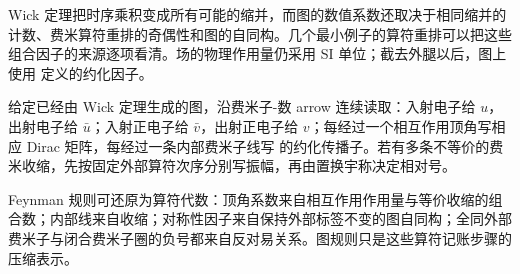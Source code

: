 
Wick 定理把时序乘积变成所有可能的缩并，而图的数值系数还取决于相同缩并的计数、费米算符重排的奇偶性和图的自同构。几个最小例子的算符重排可以把这些组合因子的来源逐项看清。场的物理作用量仍采用 SI 单位；截去外腿以后，图上使用
定义的约化因子。

给定已经由 Wick 定理生成的图，沿费米子-数 arrow 连续读取：入射电子给 $u$，出射电子给 $\bar u$；入射正电子给 $\bar v$，出射正电子给 $v$；每经过一个相互作用顶角写相应 Dirac 矩阵，每经过一条内部费米子线写
 的约化传播子。若有多条不等价的费米收缩，先按固定外部算符次序分别写振幅，再由置换宇称决定相对号。


Feynman 规则可还原为算符代数：顶角系数来自相互作用作用量与等价收缩的组合数；内部线来自收缩；对称性因子来自保持外部标签不变的图自同构；全同外部费米子与闭合费米子圈的负号都来自反对易关系。图规则只是这些算符记账步骤的压缩表示。

